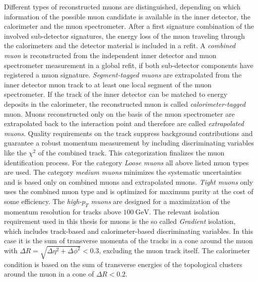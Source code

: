 Different types of reconstructed muons are distinguished, depending on which information of the possible muon candidate is available in the inner detector, the calorimeter and the muon spectrometer. After a first signature combination of the involved sub-detector signatures, the energy loss of the muon traveling through the calorimeters and the detector material is included in a refit. A \textit{combined muon} is reconstructed from the independent inner detector and muon spectrometer measurement in a global refit, if both sub-detector components have registered a muon signature. \textit{Segment-tagged muons} are extrapolated from the inner detector muon track to at least one local segment of the muon spectrometer. If the track of the inner detector can be matched to energy deposits in the calorimeter, the reconstructed muon is called \textit{calorimeter-tagged} muon. Muons reconstructed only on the basis of the muon spectrometer are extrapolated back to the interaction point and therefore are called \textit{extrapolated muons}.\cite{muPerformance}\newline
Quality requirements on the track suppress background contributions and guarantee a robust momentum measurement by including discriminating variables like the $\chi^2$ of the combined track. This categorization finalizes the muon identification process. For the category \textit{Loose muons} all above listed muon types are used. The category \textit{medium muons} minimizes the systematic uncertainties and is based only on combined muons and extrapolated muons. \textit{Tight muons} only uses the combined muon type and is optimized for maximum purity at the cost of some efficiency. The \textit{high-$p_T$ muons} are designed for  a maximization of the momentum resolution for tracks above $\SI{100}{\giga\electronvolt}$. \cite{muPerformance}\newline
The relevant isolation requirement used in this thesis for muons is the so called \textit{Gradient} isolation, which includes track-based and calorimeter-based discriminating variables. In this case it is the sum of transverse momenta of the tracks in a cone around the muon with $\Delta R=\sqrt{\Delta\eta^2+\Delta\phi^2}<0.3$, excluding the muon track itself. The calorimeter condition is based on the sum of transverse energies of the topological clusters around the muon in a cone of $\Delta R<0.2$. \cite{muPerformance}\cite{varcone}     
%
%
%

